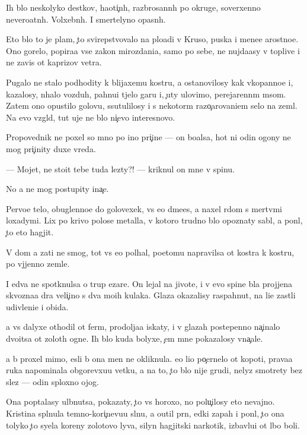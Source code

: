 \documentclass[10pt]{book}
\begin{document}
Ih b{\yi}lo neskolyko des{\ia}tkov, haoti{\c}n{\yi}h, razbrosann{\yi}h po okruge, soverxenno nevero{\y}atn{\yi}h. Volxebn{\yi}h. I smertelyno opasn{\yi}h.

Eto b{\yi}lo to je plam{\ia}, {\c}to svirepstvovalo na plo{\x}adi v Kruso, puska{\y} i mene{\y}e {\y}arostno{\y}e. Ono gorelo, popira{\y}a vse zakon{\yi} mirozdani{\y}a, samo po sebe, ne nujda{\y}asy v toplive i ne zavis{\ia} ot kaprizov vetra.

Pugalo ne stalo podhodity k blija{\y}xemu kostru, a ostanovilosy kak vkopanno{\y}e i, kazalosy, n{\iu}halo vozduh, pahnu{\x}i{\y} t{\ia}jelo{\y} gar{\y}u i, {\c}uty ulovimo, perejarenn{\yi}m m{\ia}som. Zatem ono opustilo golovu, ssutulilosy i s nekotor{\yi}m razo{\c}arovani{\y}em selo na zeml{\iu}. Na {\y}evo vzgl{\ia}d, tut uje ne b{\yi}lo ni{\c}evo interesnovo.

Propovednik ne poxel so mno{\y} po ino{\y} pri{\c}ine — on bo{\y}alsa, hot{\ia} ni odin ogony ne mog pri{\c}inity duxe vreda.

— Mojet, ne sto{\y}it tebe tuda lezty?! — kriknul on mne v spinu.

No {\y}a ne mog postupity ina{\c}e.

Pervo{\y}e telo, obuglenno{\y}e do golovexek, vs{\e} {\y}e{\x}o d{\yi}m{\ia}{\x}e{\y}es{\ia}, {\y}a naxel r{\ia}dom s mertv{\yi}mi loxadymi. Lix po krivo{\y} polose metalla, v kotoro{\y} trudno b{\yi}lo opoznaty sabl{\iu}, {\y}a pon{\ia}l, {\c}to eto hagjit.

V dom {\y}a za{\y}ti ne smog, tot vs{\e} {\y}e{\x}o pol{\yi}hal, poetomu napravilsa ot kostra k kostru, po v{\yi}jjenno{\y} zemle.

I {\y}edva ne spotknulsa o trup {\C}ezare. On lejal na jivote, i v {\y}evo spine b{\yi}la projjena skvozna{\y}a d{\yi}ra veli{\c}ino{\y} s dva mo{\y}ih kulaka. Glaza okazalisy raspahnut{\yi}, na li{\q}e zast{\yi}li udivleni{\y}e i obida.

{\Y}a vs{\e} dalyxe othodil ot ferm{\yi}, prodolja{\y}a iskaty, i v glazah postepenno na{\c}inalo dvo{\y}itsa ot zolot{\yi}h ogne{\y}. Ih b{\yi}lo kuda bolyxe, {\c}em mne pokazalosy vna{\c}ale.

{\Y}a b{\yi} proxel mimo, {\y}esli b{\yi} ona men{\ia} ne okliknula. {\y}e{\y}o li{\q}o po{\c}ernelo ot kopoti, prava{\y}a ruka napominala obgorevxu{\y}u vetku, a na to, {\c}to b{\yi}lo nije grudi, nelyz{\ia} smotrety bez slez — odin sploxno{\y} ojog.

Ona pop{\yi}talasy ul{\yi}bnutsa, pokazaty, {\c}to vs{\e} horoxo, no polu{\c}ilosy eto nevajno. Kristina spl{\iu}nula temno-kori{\c}nevu{\y}u sl{\iu}nu, {\y}a o{\x}util pr{\ia}n{\yi}{\y}, {\y}edki{\y} zapah i pon{\ia}l, {\c}to ona tolyko {\c}to syela koreny zolotovo lyva, silyn{\yi}{\y} hagjitski{\y} narkotik, izbavl{\ia}{\y}u{\x}i{\y} ot l{\iu}bo{\y} boli.
\end{document}
